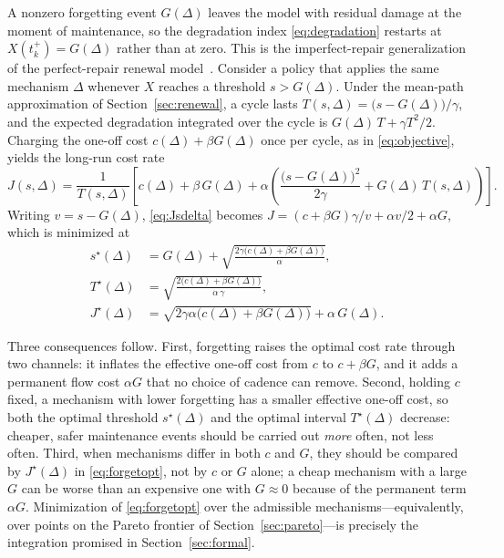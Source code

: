 \documentclass[electronics,article,submit,pdftex,moreauthors]{Definitions/mdpi}
\newcommand{\D}{\varDelta}                 %
\newcommand{\tkp}{t_k^{+}}
\begin{document}
A nonzero forgetting event $G(\D)$ leaves the model with residual damage at the moment of maintenance, so the degradation index \eqref{eq:degradation} restarts at $X(\tkp)=G(\D)$ rather than at zero. This is the imperfect-repair generalization of the perfect-repair renewal model~\cite{Pham1996}. Consider a policy that applies the same mechanism $\D$ whenever $X$ reaches a threshold $s>G(\D)$. Under the mean-path approximation of Section~\ref{sec:renewal}, a cycle lasts $T(s,\D)=\bigl(s-G(\D)\bigr)/\gamma$, and the expected degradation integrated over the cycle is $G(\D)\,T+\gamma T^2/2$. Charging the one-off cost $c(\D)+\beta G(\D)$ once per cycle, as in \eqref{eq:objective}, yields the long-run cost rate
\begin{equation}\label{eq:Jsdelta}
J(s,\D)=\frac{1}{T(s,\D)}\left[c(\D)+\beta\,G(\D)+\alpha\left(\frac{\bigl(s-G(\D)\bigr)^2}{2\gamma}+G(\D)\,T(s,\D)\right)\right].
\end{equation}
Writing $v=s-G(\D)$, \eqref{eq:Jsdelta} becomes $J=(c+\beta G)\gamma/v+\alpha v/2+\alpha G$, which is minimized at
\begin{equation}\label{eq:forgetopt}
\begin{aligned}
s^\star(\D)&=G(\D)+\sqrt{\frac{2\gamma\bigl(c(\D)+\beta G(\D)\bigr)}{\alpha}},\\
T^\star(\D)&=\sqrt{\frac{2\bigl(c(\D)+\beta G(\D)\bigr)}{\alpha\,\gamma}},\\
J^\star(\D)&=\sqrt{2\gamma\alpha\bigl(c(\D)+\beta G(\D)\bigr)}+\alpha\,G(\D).
\end{aligned}
\end{equation}

Three consequences follow. First, forgetting raises the optimal cost rate through two channels: it inflates the effective one-off cost from $c$ to $c+\beta G$, and it adds a permanent flow cost $\alpha G$ that no choice of cadence can remove. Second, holding $c$ fixed, a mechanism with lower forgetting has a smaller effective one-off cost, so both the optimal threshold $s^\star(\D)$ and the optimal interval $T^\star(\D)$ decrease: cheaper, safer maintenance events should be carried out \textit{more} often, not less often. Third, when mechanisms differ in both $c$ and $G$, they should be compared by $J^\star(\D)$ in \eqref{eq:forgetopt}, not by $c$ or $G$ alone; a cheap mechanism with a large $G$ can be worse than an expensive one with $G\approx 0$ because of the permanent term $\alpha G$. Minimization of \eqref{eq:forgetopt} over the admissible mechanisms---equivalently, over points on the Pareto frontier of Section~\ref{sec:pareto}---is precisely the integration promised in Section~\ref{sec:formal}.
\end{document}
